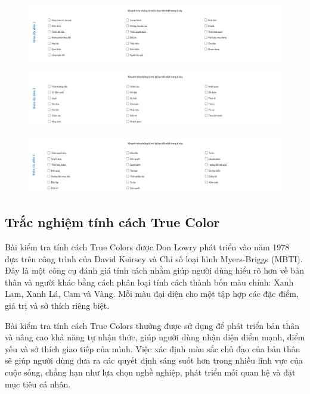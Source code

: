 \begin{figure}[H]
    \centering
    \includegraphics[width=0.9\linewidth,height=0.6\textheight]{images/ws2.png}
\end{figure}

\begin{figure}[H]
    \centering
    \includegraphics[width=0.9\linewidth,height=0.6\textheight]{images/ws3.png}
\end{figure}

\begin{figure}[H]
    \centering
    \includegraphics[width=0.9\linewidth,height=0.6\textheight]{images/ws4.png}
\end{figure}

\subsection{Trắc nghiệm tính cách True Color}

Bài kiểm tra tính cách True Colors được Don Lowry phát triển vào năm 1978 dựa trên công trình của David Keirsey và Chỉ số loại hình Myers-Briggs (MBTI). Đây là một công cụ đánh giá tính cách nhằm giúp người dùng hiểu rõ hơn về bản thân và người khác bằng cách phân loại tính cách thành bốn màu chính: Xanh Lam, Xanh Lá, Cam và Vàng. Mỗi màu đại diện cho một tập hợp các đặc điểm, giá trị và sở thích riêng biệt.

Bài kiểm tra tính cách True Colors thường được sử dụng để phát triển bản thân và nâng cao khả năng tự nhận thức, giúp người dùng nhận diện điểm mạnh, điểm yếu và sở thích giao tiếp của mình. Việc xác định màu sắc chủ đạo của bản thân sẽ giúp người dùng đưa ra các quyết định sáng suốt hơn trong nhiều lĩnh vực của cuộc sống, chẳng hạn như lựa chọn nghề nghiệp, phát triển mối quan hệ và đặt mục tiêu cá nhân.

